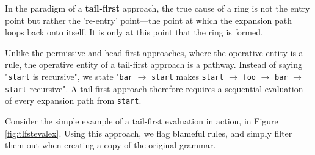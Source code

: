 \documentclass[8pt, twoside]{extarticle}
\begin{document}
In the paradigm of a \textbf{tail-first} approach, the true cause of a ring is not the entry point but rather the 're-entry' point—the point at which the expansion path loops back onto itself. It is only at this point that the ring is formed.

Unlike the permissive and head-first approaches, where the operative entity is a rule, the operative entity of a tail-first approach is a pathway. Instead of saying "\verb|start| is recursive", we state "\verb|bar| $\rightarrow$ \verb|start| makes \verb|start| $\rightarrow$ \verb|foo| $\rightarrow$ \verb|bar| $\rightarrow$ \verb|start| recursive". A tail first approach therefore requires a sequential evaluation of every expansion path from \verb|start|.

Consider the simple example of a tail-first evaluation in action, in Figure \ref{fig:tlfstevalex}. Using this approach, we flag blameful rules, and simply filter them out when creating a copy of the original grammar.
\end{document}
